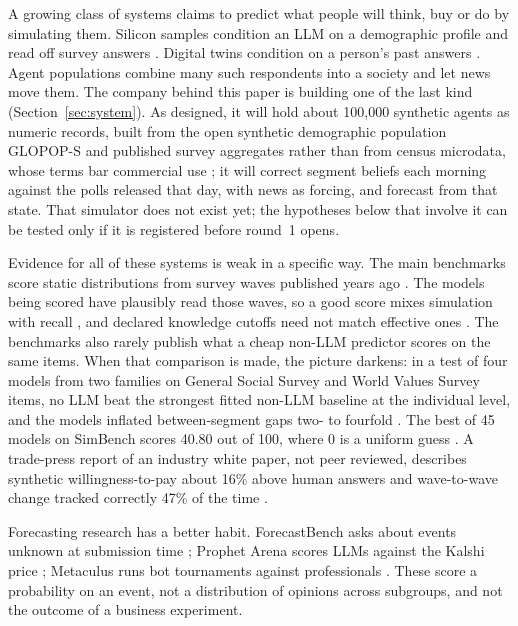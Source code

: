\documentclass[11pt]{article}
\begin{document}
A growing class of systems claims to predict what people will think, buy or do by simulating them. Silicon samples condition an LLM on a demographic profile and read off survey answers \citep{argyle2023outofone}. Digital twins condition on a person's past answers \citep{park2024agents,toubia2025twin}. Agent populations combine many such respondents into a society and let news move them. The company behind this paper is building one of the last kind (Section~\ref{sec:system}). As designed, it will hold about 100{,}000 synthetic agents as numeric records, built from the open synthetic demographic population GLOPOP-S \citep{ton2024glopop} and published survey aggregates rather than from census microdata, whose terms bar commercial use \citep{ipumsi2026}; it will correct segment beliefs each morning against the polls released that day, with news as forcing, and forecast from that state. That simulator does not exist yet; the hypotheses below that involve it can be tested only if it is registered before round~1 opens.

Evidence for all of these systems is weak in a specific way. The main benchmarks score static distributions from survey waves published years ago \citep{santurkar2023whose,durmus2023global,hu2026simbench}. The models being scored have plausibly read those waves, so a good score mixes simulation with recall \citep{sainz2023nlp}, and declared knowledge cutoffs need not match effective ones \citep{cheng2024dated}. The benchmarks also rarely publish what a cheap non-LLM predictor scores on the same items. When that comparison is made, the picture darkens: in a test of four models from two families on General Social Survey and World Values Survey items, no LLM beat the strongest fitted non-LLM baseline at the individual level, and the models inflated between-segment gaps two- to fourfold \citep{chen2026synthetic}. The best of 45 models on SimBench scores 40.80 out of 100, where 0 is a uniform guess \citep{hu2026simbench}. A trade-press report of an industry white paper, not peer reviewed, describes synthetic willingness-to-pay about 16\% above human answers and wave-to-wave change tracked correctly 47\% of the time \citep{researchlive2026strat7}.

Forecasting research has a better habit. ForecastBench asks about events unknown at submission time \citep{karger2024forecastbench}; Prophet Arena scores LLMs against the Kalshi price \citep{yang2025prophet}; Metaculus runs bot tournaments against professionals \citep{wilson2026futureeval}. These score a probability on an event, not a distribution of opinions across subgroups, and not the outcome of a business experiment.
\end{document}
